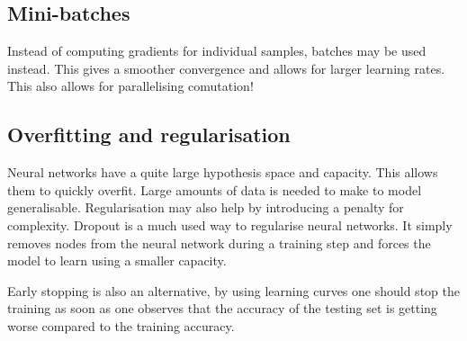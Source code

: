 \subsection{Mini-batches}
Instead of computing gradients for individual samples, batches may be used 
instead. This gives a smoother convergence and allows for larger learning
rates. This also allows for parallelising comutation!

\subsection{Overfitting and regularisation}
Neural networks have a quite large hypothesis space and capacity. This allows 
them to quickly overfit. Large amounts of data is needed to make to model
generalisable. Regularisation may also help by introducing a penalty for 
complexity. Dropout is a much used way to regularise neural networks.
It simply removes nodes from the neural network during a training step and
forces the model to learn using a smaller capacity.

\medskip

Early stopping is also an alternative, by using learning curves one should stop
the training as soon as one observes that the accuracy of the testing set is 
getting worse compared to the training accuracy.